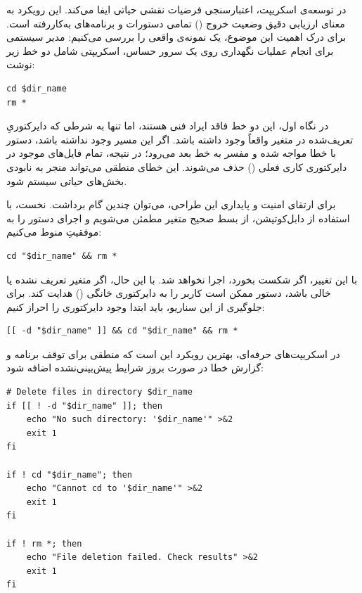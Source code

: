 در توسعه‌ی اسکریپت، اعتبارسنجی فرضیات نقشی حیاتی ایفا می‌کند. این رویکرد به معنای ارزیابی دقیق وضعیت خروج () تمامی دستورات و برنامه‌های به‌کاررفته است. برای درک اهمیت این موضوع، یک نمونه‌ی واقعی را بررسی می‌کنیم: مدیر سیستمی برای انجام عملیات نگهداری روی یک سرور حساس، اسکریپتی شامل دو خط زیر نوشت:

\begin{latin}
\begin{lstlisting}
cd $dir_name
rm *
\end{lstlisting}
\end{latin}

در نگاه اول، این دو خط فاقد ایراد فنی هستند، اما تنها به شرطی که دایرکتوریِ تعریف‌شده در متغیر  واقعاً وجود داشته باشد. اگر این مسیر وجود نداشته باشد، دستور  با خطا مواجه شده و مفسر به خط بعد می‌رود؛ در نتیجه، تمام فایل‌های موجود در دایرکتوری کاری فعلی () حذف می‌شوند. این خطای منطقی می‌تواند منجر به نابودی بخش‌های حیاتی سیستم شود.

برای ارتقای امنیت و پایداری این طراحی، می‌توان چندین گام برداشت. نخست، با استفاده از دابل‌کوتیشن، از بسط صحیح متغیر مطمئن می‌شویم و اجرای دستور  را به موفقیتِ  منوط می‌کنیم:

\begin{latin}
\begin{lstlisting}
cd "$dir_name" && rm *
\end{lstlisting}
\end{latin}

با این تغییر، اگر  شکست بخورد،  اجرا نخواهد شد. با این حال، اگر متغیر  تعریف نشده یا خالی باشد، دستور  ممکن است کاربر را به دایرکتوری خانگی () هدایت کند. برای جلوگیری از این سناریو، باید ابتدا وجود دایرکتوری را احراز کنیم:

\begin{latin}
\begin{lstlisting}
[[ -d "$dir_name" ]] && cd "$dir_name" && rm *
\end{lstlisting}
\end{latin}

در اسکریپت‌های حرفه‌ای، بهترین رویکرد این است که منطقی برای توقف برنامه و گزارش خطا در صورت بروز شرایط پیش‌بینی‌نشده اضافه شود:

\begin{latin}
\begin{lstlisting}
# Delete files in directory $dir_name
if [[ ! -d "$dir_name" ]]; then
    echo "No such directory: '$dir_name'" >&2
    exit 1
fi

if ! cd "$dir_name"; then
    echo "Cannot cd to '$dir_name'" >&2
    exit 1
fi

if ! rm *; then
    echo "File deletion failed. Check results" >&2
    exit 1
fi
\end{lstlisting}
\end{latin}


